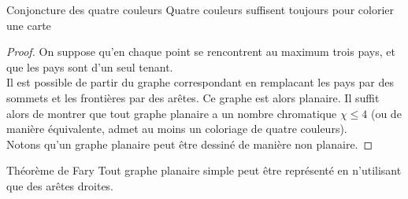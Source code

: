 \begin{mytheo}
Conjoncture des quatre couleurs
Quatre couleurs suffisent toujours pour colorier une carte
\begin{proof}
On suppose qu'en chaque point se rencontrent au maximum trois pays, et que les pays sont d'un seul tenant.\\


Il est possible de partir du graphe correspondant en remplacant les pays par des sommets et les frontières par des arêtes. Ce graphe est alors planaire. Il suffit alors de montrer que tout graphe planaire a un nombre chromatique $\chi \leq 4$ (ou de manière équivalente, admet au moins un coloriage de quatre couleurs).\\

Notons qu'un graphe planaire peut être dessiné de manière non planaire.
\end{proof}
\end{mytheo}

\begin{mytheo}
Théorème de Fary
Tout graphe planaire simple peut être représenté en n'utilisant que des arêtes droites.
\end{mytheo}

